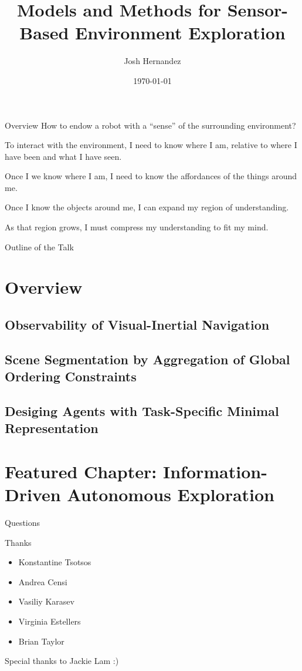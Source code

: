 \documentclass[handout]{beamer}
\author{Josh Hernandez}
\title{Models and Methods for Sensor-Based
Environment Exploration}
\date{\today}
\begin{document}
\titlepageframe

\begin{tframe}{Overview}
How to endow a robot with a ``sense'' of the surrounding environment?
\begin{description}
 \item<2->[Localization] To interact with the environment, I need to know where I am, relative to where I have been and what I have seen.
 \item<3->[Mapping] Once I we know where I am, I need to know the affordances of the things around me.
 \item<4->[Exploration] Once I know the objects around me, I can expand my region of understanding.
 \item<5->[Representation] As that region grows, I must compress my understanding to fit my mind.
\end{description}
\end{tframe}
\begin{tframe}{Outline of the Talk}
\tableofcontents
\end{tframe}
\section{Overview}
\subsection{Observability of Visual-Inertial Navigation}

\subsection{Scene Segmentation by Aggregation of Global Ordering Constraints}

\subsection{Desiging Agents with Task-Specific Minimal Representation}

\section{Featured Chapter: Information-Driven Autonomous Exploration}


\begin{tframe}{Questions}
\end{tframe}

\begin{tframe}{Thanks}
\begin{itemize}
\item Konstantine Tsotsos
\item Andrea Censi
\item Vasiliy Karasev
\item Virginia Estellers
\item Brian Taylor
\end{itemize}
Special thanks to Jackie Lam :)
\end{tframe}
\end{document}
